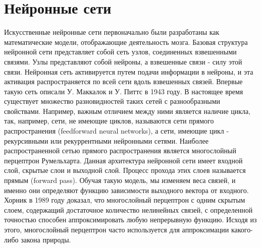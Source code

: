\section{Нейронные сети}\label{ner_network}
    Искусственные нейронные сети первоначально были разработаны как математические модели, отображающие деятельность мозга. Базовая структура нейронной сети представляет собой сеть узлов, соединенных взвешенными связями. Узлы представляют собой нейроны, а взвешенные связи - силу этой связи. Нейронная сеть активируется путем подачи информации в нейроны, и эта активация распространяется по всей сети вдоль взвешенных связей. Впервые такую сеть описали У. Маккалок и У. Питтс в 1943 году. В настоящее время существует множество разновидностей таких сетей с разнообразными свойствами. Например, важным отличием между ними является наличие цикла, так, например, сети, не имеющие циклов, называются сети прямого распространения (feedforward neural networks), а сети, имеющие цикл - рекурсивными или рекуррентными нейронными сетями. Наиболее распространенной сетью прямого распространения является многослойный перцептрон Румельхарта. Данная архитектура нейронной сети имеет входной слой, скрытые слои и выходной слой. Процесс прохода этих слоев называется прямым (forward pass). Обучая такую модель, мы изменяем веса связей, и именно они определяют функцию зависимости выходного вектора от входного. Хорник в 1989 году доказал, что многослойный перцептрон с одним скрытым слоем, содержащий достаточное количество нелинейных связей, с определенной точностью способен аппроксимировать любую непрерывную функцию. Исходя из этого, многослойный перцептрон часто используется для аппроксимации какого-либо закона природы.


